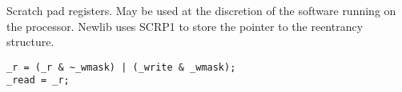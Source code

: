 
Scratch pad registers. May be used at the discretion of the software running on
the processor. Newlib uses SCRP1 to store the pointer to the reentrancy
structure.

\declaration{}
\implementation{}
\begin{lstlisting}
_r = (_r & ~_wmask) | (_write & _wmask);
_read = _r;
\end{lstlisting}

